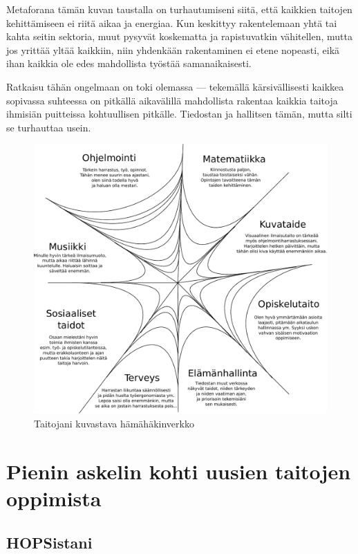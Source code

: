 \documentclass[utf8]{gradu3}
\begin{document}
Metaforana tämän kuvan taustalla on turhautumiseni siitä, että kaikkien
taitojen kehittämiseen ei riitä aikaa ja energiaa. Kun keskittyy
rakentelemaan yhtä tai kahta seitin sektoria, muut pysyvät koskematta ja
rapistuvatkin vähitellen, mutta jos yrittää yltää kaikkiin, niin yhdenkään
rakentaminen ei etene nopeasti, eikä ihan kaikkia ole edes mahdollista
työstää samanaikaisesti.

Ratkaisu tähän ongelmaan on toki olemassa — tekemällä kärsivällisesti kaikkea
sopivassa suhteessa on pitkällä aikavälillä mahdollista rakentaa kaikkia
taitoja ihmisiän puitteissa kohtuullisen pitkälle. Tiedostan ja hallitsen
tämän, mutta silti se turhauttaa usein.

\begin{figure}[tp]
  \centering
  \includegraphics[width=\textwidth]{meitsi}
  \caption{\label{verkko}Taitojani kuvastava hämähäkinverkko}
\end{figure}




\chapter{Pienin askelin kohti uusien taitojen oppimista}
\label{hopsJaGradu}

\section{HOPSistani}
\end{document}
